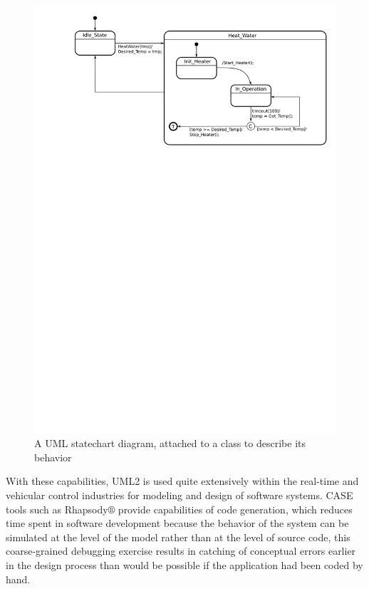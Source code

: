 \begin{figure}
\centering
\includegraphics[scale=0.5]{figs/statechart}
\caption{A UML statechart diagram, attached to a class to describe its
  behavior}
\label{fig:statechart}
\end{figure}

With these capabilities, UML2 is used quite extensively within the
real-time and vehicular control industries for modeling and design of
software systems. CASE tools such as Rhapsody$\circledR$ provide
capabilities of code generation, which reduces time spent in software
development because the behavior of the system can be simulated at the
level of the model rather than at the level of source code, this
coarse-grained debugging exercise results in catching of conceptual
errors earlier in the design process than would be possible if the
application had been coded by hand.

